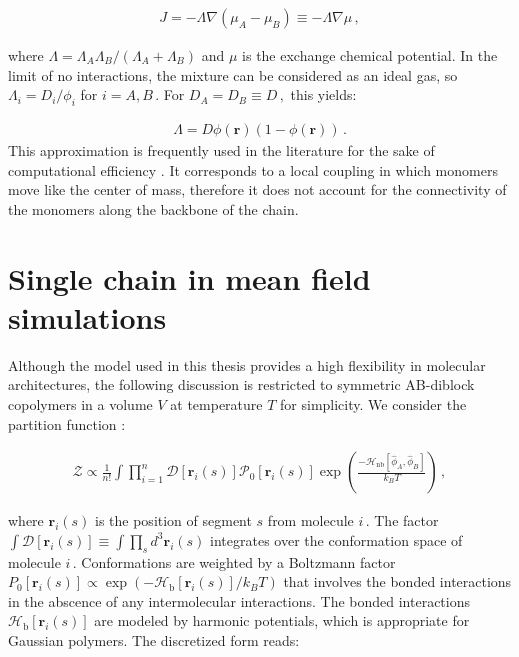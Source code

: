 \documentclass[bachelor,       %
               twoside,        %
               BCOR10mm,       %
               ngerman, english %
               ]{GAUBM}
\begin{document}
\begin{align}
  J=-\Lambda\nabla(\mu_A - \mu_B)\equiv -\Lambda\nabla\mu\,,
\end{align}

where $\Lambda=\Lambda_A\Lambda_B/(\Lambda_A+\Lambda_B)$ and $\mu$ is the exchange chemical potential. In the limit of no interactions, the mixture can be considered as an ideal gas, so $\Lambda_i=D_i/\phi_i$ for $i=A, B\,.$ For $D_A=D_B\equiv D\,,$ this yields:

\begin{align}
  \Lambda=D\phi(\mathbf{r})(1-\phi(\mathbf{r}))\,.
  \label{eq:onsager}
\end{align}
This approximation is frequently used in the literature for the sake of computational efficiency \cite{Fraaje97,deGennes80,Binder83}. It corresponds to a local coupling in which monomers move like the center of mass, therefore it does not account for the connectivity of the monomers along the backbone of the chain. 

\section{Single chain in mean field simulations}



Although the model used in this thesis provides a high flexibility in molecular architectures, the following discussion is restricted to symmetric  AB-diblock copolymers in a volume $V$ at temperature $T$ for simplicity. We consider the partition function \cite{Daoulas06}:

\begin{align}
    \mathcal{Z}\propto\frac{1}{n!}\int{\prod_{i=1}^n\mathcal{D}[\mathbf r_i(s)]\mathcal P_0[\mathbf r_i(s)]\exp\left(\frac{-\mathcal H_{\text{nb}}[\hat\phi_A,\hat\phi_B]}{k_BT}\right)}\,,
    \label{eq:partition_punction}
\end{align}

where $\mathbf r_i(s)$ is the position of segment $s$ from molecule $i\,.$ The factor $\int\mathcal{D}[\mathbf r_i(s)]\equiv \int\prod_sd^3\mathbf r_i(s)$ integrates over the conformation space of molecule $i\,.$ Conformations are weighted by a Boltzmann factor $P_0[\mathbf r_i(s)]\propto\exp\left(-\mathcal H_{\text{b}}[\mathbf r_i(s)]/k_BT\right)$ that involves the bonded interactions in the abscence of any intermolecular interactions. The bonded interactions $\mathcal H_{\text{b}}[\mathbf r_i(s)]$ are modeled by harmonic potentials, which is appropriate for Gaussian polymers. The discretized form reads:
\end{document}
